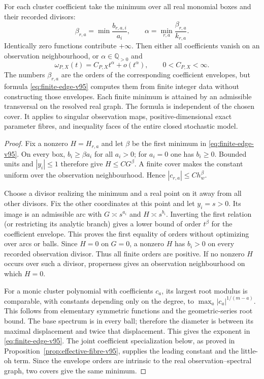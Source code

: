 \begin{theorem}
\label{thm:finite-newton-v95}
For each cluster coefficient take the minimum over all real monomial
boxes and their recorded divisors:
\begin{equation}\label{eq:finite-edge-v95}
 \beta_{r,a}=\min\frac{b_{r,a,i}}{a_i},\qquad
 \alpha=\min_{r,a}\frac{\beta_{r,a}}{k_{r,a}}.
\end{equation}
Identically zero functions contribute $+\infty$. Then either all
coefficients vanish on an observation neighbourhood, or
$\alpha\in\mathbb Q_{>0}$ and
\begin{equation}\label{eq:finite-law-v95}
 \omega_{P,X}(t)=C_{P,X}t^\alpha+o(t^\alpha),\qquad 0<C_{P,X}<\infty.
\end{equation}
The numbers $\beta_{r,a}$ are the orders of the corresponding coefficient
envelopes, but formula \eqref{eq:finite-edge-v95} computes them from
finite integer data without constructing those envelopes. Each finite
minimum is attained by an admissible transversal on the resolved real
graph. The formula is independent of the chosen cover. It applies to
singular observation maps, positive-dimensional exact parameter fibres,
and inequality faces of the entire closed stochastic model.
\end{theorem}
\begin{proof}
Fix a nonzero $H=H_{r,a}$ and let $\beta$ be the first minimum in
\eqref{eq:finite-edge-v95}. On every box, $b_i\ge\beta a_i$ for all
$a_i>0$; for $a_i=0$ one has $b_i\ge0$. Bounded units and
$|y_i|\le1$ therefore give $H\le C G^\beta$. A finite cover makes the
constant uniform over the observation neighbourhood. Hence
$|c_{r,a}|\le C h_w^\beta$.

Choose a divisor realizing the minimum and a real point on it away from
all other divisors. Fix the other coordinates at this point and let
$y_i=s>0$. Its image is an admissible arc with
$G\asymp s^{a_i}$ and $H\asymp s^{b_i}$. Inverting the first relation
(or restricting its analytic branch) gives a lower bound of order
$t^\beta$ for the coefficient envelope. This proves the first equality
of orders without optimizing over arcs or balls. Since $H=0$ on $G=0$,
a nonzero $H$ has $b_i>0$ on every recorded observation divisor. Thus
all finite orders are positive. If no nonzero $H$ occurs over such a
divisor, properness gives an observation neighbourhood on which $H=0$.

For a monic cluster polynomial with coefficients $c_a$, its largest root
modulus is comparable, with constants depending only on the degree, to
$\max_a|c_a|^{1/(m-a)}$. This follows from elementary symmetric functions
and the geometric-series root bound. The base spectrum is in every
ball; therefore the diameter is between its maximal displacement and
twice that displacement. This gives the exponent in
\eqref{eq:finite-edge-v95}. The joint coefficient specialization below,
as proved in Proposition~\ref{prop:effective-fibre-v95}, supplies the leading constant and
the little-oh term. Since the envelope orders are intrinsic to the real
observation--spectral graph, two covers give the same minimum.
\end{proof}

